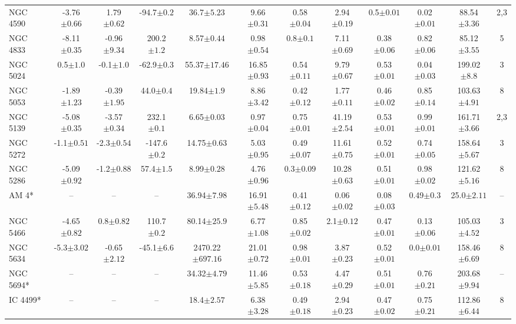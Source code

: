 \begin{landscape}
\begin{table}
\begin{tabular}{lccccccccccc}
NGC 4590 & -3.76$\pm{0.66}$ & 1.79$\pm{0.62}$ & -94.7$\pm{0.2}$ & 36.7$\pm{5.23}$ & 9.66$\pm{0.31}$ & 0.58$\pm{0.04}$ & 2.94$\pm{0.19}$ & 0.5$\pm{0.01}$ & 0.02$\pm{0.01}$ & 88.54$\pm{3.36}$&2,3 \\ 
NGC 4833 & -8.11$\pm{0.35}$ & -0.96$\pm{9.34}$ & 200.2$\pm{1.2}$ & 8.57$\pm{0.44}$ & 0.98$\pm{0.54}$ & 0.8$\pm{0.1}$ & 7.11$\pm{0.69}$ & 0.38$\pm{0.06}$ & 0.82$\pm{0.06}$ & 85.12$\pm{3.55}$&5 \\ 
NGC 5024 & 0.5$\pm{1.0}$ & -0.1$\pm{1.0}$ & -62.9$\pm{0.3}$ & 55.37$\pm{17.46}$ & 16.85$\pm{0.93}$ & 0.54$\pm{0.11}$ & 9.79$\pm{0.67}$ & 0.53$\pm{0.01}$ & 0.04$\pm{0.03}$ & 199.02$\pm{8.8}$&3 \\ 
NGC 5053 & -1.89$\pm{1.23}$ & -0.39$\pm{1.95}$ & 44.0$\pm{0.4}$ & 19.84$\pm{1.9}$ & 8.86$\pm{3.42}$ & 0.42$\pm{0.12}$ & 1.77$\pm{0.11}$ & 0.46$\pm{0.02}$ & 0.85$\pm{0.14}$ & 103.63$\pm{4.91}$&8 \\ 
NGC 5139 & -5.08$\pm{0.35}$ & -3.57$\pm{0.34}$ & 232.1$\pm{0.1}$ & 6.65$\pm{0.03}$ & 0.97$\pm{0.04}$ & 0.75$\pm{0.01}$ & 41.19$\pm{2.54}$ & 0.53$\pm{0.01}$ & 0.99$\pm{0.01}$ & 161.71$\pm{3.66}$&2,3 \\ 
NGC 5272 & -1.1$\pm{0.51}$ & -2.3$\pm{0.54}$ & -147.6$\pm{0.2}$ & 14.75$\pm{0.63}$ & 5.03$\pm{0.95}$ & 0.49$\pm{0.07}$ & 11.61$\pm{0.75}$ & 0.52$\pm{0.01}$ & 0.74$\pm{0.05}$ & 158.64$\pm{5.67}$&3 \\ 
NGC 5286 & -5.09$\pm{0.92}$ & -1.2$\pm{0.88}$ & 57.4$\pm{1.5}$ & 8.99$\pm{0.28}$ & 4.76$\pm{0.96}$ & 0.3$\pm{0.09}$ & 10.28$\pm{0.63}$ & 0.51$\pm{0.01}$ & 0.98$\pm{0.02}$ & 121.62$\pm{5.16}$&8 \\ 
AM 4* & -- & -- & -- & 36.94$\pm{7.98}$ & 16.91$\pm{5.48}$ & 0.41$\pm{0.12}$ & 0.06$\pm{0.02}$ & 0.08$\pm{0.03}$ & 0.49$\pm{0.3}$ & 25.0$\pm{2.11}$&-- \\ 
NGC 5466 & -4.65$\pm{0.82}$ & 0.8$\pm{0.82}$ & 110.7$\pm{0.2}$ & 80.14$\pm{25.9}$ & 6.77$\pm{1.08}$ & 0.85$\pm{0.02}$ & 2.1$\pm{0.12}$ & 0.47$\pm{0.01}$ & 0.13$\pm{0.06}$ & 105.03$\pm{4.52}$&3 \\ 
NGC 5634 & -5.3$\pm{3.02}$ & -0.65$\pm{2.12}$ & -45.1$\pm{6.6}$ & 2470.22$\pm{697.16}$ & 21.01$\pm{0.72}$ & 0.98$\pm{0.01}$ & 3.87$\pm{0.23}$ & 0.52$\pm{0.01}$ & 0.0$\pm{0.01}$ & 158.46$\pm{6.69}$&8 \\ 
NGC 5694* & -- & -- & -- & 34.32$\pm{4.79}$ & 11.46$\pm{5.85}$ & 0.53$\pm{0.18}$ & 4.47$\pm{0.29}$ & 0.51$\pm{0.01}$ & 0.76$\pm{0.21}$ & 203.68$\pm{9.94}$&-- \\ 
IC 4499* & -- & -- & -- & 18.4$\pm{2.57}$ & 6.38$\pm{3.28}$ & 0.49$\pm{0.18}$ & 2.94$\pm{0.23}$ & 0.47$\pm{0.02}$ & 0.75$\pm{0.21}$ & 112.86$\pm{6.44}$&8 \\ 

\end{tabular}
\end{table}
\end{landscape}
